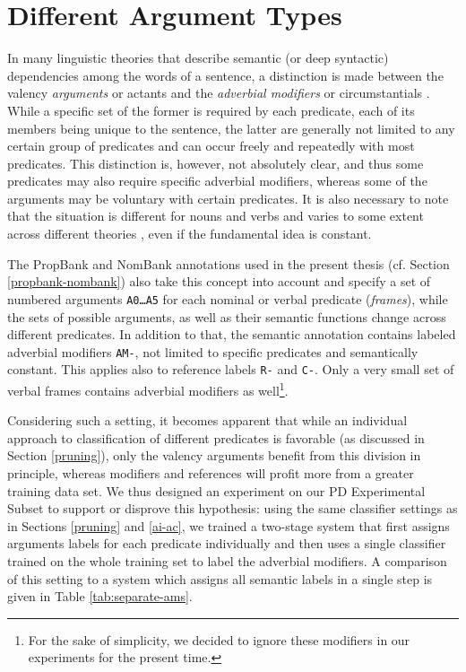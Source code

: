 \documentclass[12pt,notitlepage]{report}
\begin{document}
\section{Different Argument Types}\label{arg-types}

In many linguistic theories that describe semantic (or deep syntactic) dependencies among the words of a sentence, a distinction is made between the valency \emph{arguments} or actants and the \emph{adverbial modifiers} or circumstantials \citep[p. 100ff.]{sgall86}. While a specific set of the former is required by each predicate, each of its members being unique to the sentence, the latter are generally not limited to any certain group of predicates and can occur freely and repeatedly with most predicates. This distinction is, however, not absolutely clear, and thus some predicates may also require specific adverbial modifiers, whereas some of the arguments may be voluntary with certain predicates. It is also necessary to note that the situation is different for nouns and verbs and varies to some extent across different theories \citep{rambow03}, even if the fundamental idea is constant.

The PropBank \citep{kingsbury02,palmer05} and NomBank \citep{meyers04} annotations used in the present thesis (cf. Section \ref{propbank-nombank}) also take this concept into account and specify a set of numbered arguments \texttt{A0\dots A5} for each nominal or verbal predicate (\emph{frames}), while the sets of possible arguments, as well as their semantic functions change across different predicates. In addition to that, the semantic annotation contains labeled adverbial modifiers \texttt{AM-}, not limited to specific predicates and semantically constant. This applies also to reference labels \texttt{R-} and \texttt{C-}. Only a very small set of verbal frames contains adverbial modifiers as well\footnote{For the sake of simplicity, we decided to ignore these modifiers in our experiments for the present time.}.

Considering such a setting, it becomes apparent that while an individual approach to classification of different predicates is favorable (as discussed in Section \ref{pruning}), only the valency arguments benefit from this division in principle, whereas modifiers and references will profit more from a greater training data set. We thus designed an experiment on our PD Experimental Subset to support or disprove this hypothesis: using the same classifier settings as in Sections \ref{pruning} and \ref{ai-ac}, we trained a two-stage system that first assigns arguments labels for each predicate individually and then uses a single classifier trained on the whole training set to label the adverbial modifiers. A comparison of this setting to a system which assigns all semantic labels in a single step is given in Table \ref{tab:separate-ams}.
\end{document}

